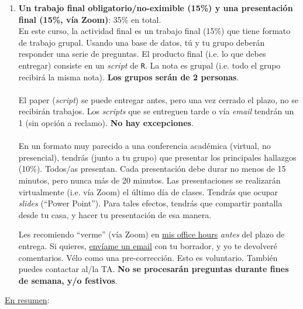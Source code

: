 \documentclass[letterpaper]{article}
\begin{document}
\begin{enumerate}
	\item {\bf Un trabajo final obligatorio/no-eximible (15\%) y una presentaci\'on final (15\%, v\'ia Zoom)}: 35\% en total.\\

		En este curso, la actividad final es un trabajo final (15\%) que tiene formato de trabajo grupal. Usando una base de datos, t\'u y tu grupo deber\'an responder una serie de preguntas. El producto final (i.e. lo que debes entregar) consiste en un \emph{script} de \texttt{R}. La nota es grupal (i.e. todo el grupo recibir\'a la misma nota). {\bf Los grupos ser\'an de 2 personas}.
\\
\\
		El paper (\emph{script}) se puede entregar antes, pero una vez cerrado el plazo, no se recibir\'an trabajos. Los \emph{scripts} que se entreguen tarde o v\'ia \emph{email} tendr\'an un 1 (sin opci\'on a reclamo). {\bf No hay excepciones}. 
\\
\\
		En un formato muy parecido a una conferencia acad\'emica (virtual, no presencial), tendr\'as (junto a tu grupo) que presentar los principales hallazgos (10\%). Todos/as presentan. Cada presentaci\'on debe durar no menos de 15 minutos, pero nunca m\'as de 20 minutos. Las presentaciones se realizar\'an virtualmente (i.e. v\'ia Zoom) el \'ultimo d\'ia de clases. Tendr\'as que ocupar \emph{slides} (``Power Point''). Para tales efectos, tendr\'as que compartir pantalla desde tu casa, y hacer tu presentaci\'on de esa manera.



Les recomiendo ``verme'' (v\'ia Zoom) en \href{https://calendly.com/bahamonde/officehours}{mis office hours} \emph{antes} del plazo de entrega. Si quieres, \href{mailto:\filetext}{env\'iame un email} con tu borrador, y yo te devolver\'e comentarios. V\'elo como una pre-correcci\'on. Esto es voluntario. Tambi\'en puedes contactar al/la TA. {\bf No se procesar\'an preguntas durante fines de semana, y/o festivos}.


\end{enumerate}


\underline{En resumen}:
\end{document}
